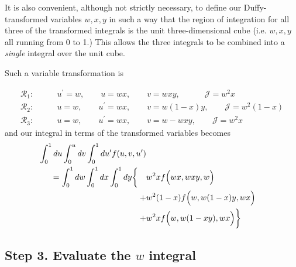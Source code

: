 \documentclass[letterpaper]{article}
\begin{document}
It is also convenient, although not strictly necessary, to define our
Duffy-transformed variables $w,x,y$ in such a way that the region of
integration for all three of the transformed integrals is the unit
three-dimensional cube (i.e. $w,x,y$ all running from 0 to 1.) This 
allows the three integrals to be combined into a \textit{single} integral 
over the unit cube.

Such a variable transformation is 

\begin{align*}
\mathcal{R}_1:\qquad
    &u^\prime=w, \qquad u=wx, \qquad v=wxy, \quad \qquad \mathcal{J}=w^2 x
\\
\mathcal{R}_2: \qquad 
    &u=w, \qquad u^\prime=wx, \qquad v=w(1-x)y, \qquad \mathcal{J}=w^2 (1-x)
\\
\mathcal{R}_3: \qquad 
    &u=w, \qquad u^\prime=wx, \qquad v=w-wxy, \qquad \mathcal{J}= w^2x
\end{align*}
and our integral in terms of the transformed variables becomes
\begin{align}
\int_0^1 du \int_0^u dv \int_0^1 du^\prime f(u,v,u^\prime)
\nonumber \\
=\int_0^1 dw \int_0^1 dx \int_0^1 dy 
  \bigg\{\quad & w^2 x f\Big(wx, wxy, w\Big)
\nonumber \\
       + &w^2(1-x) f\Big(w, w(1-x)y, wx\Big)
\nonumber \\
       + &w^2x  f\Big(w, w(1-xy), wx\Big)
  \bigg\}
\label{TransformedEdgePanelIntegral1}
\end{align}

\subsection*{Step 3. Evaluate the $w$ integral}
\end{document}
